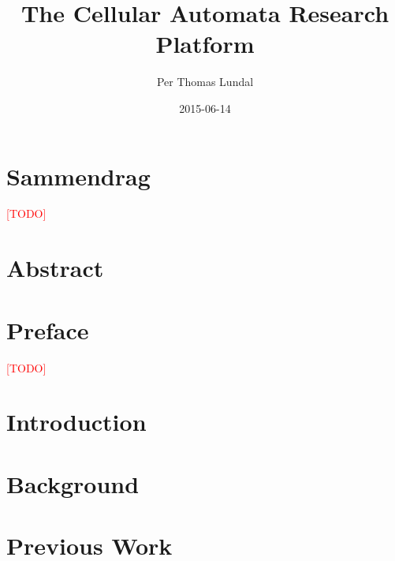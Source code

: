 \documentclass[a4paper,twoside,12pt]{book}
\title{
    {The Cellular Automata Research Platform}\\
    \TODO
}
\author{Per Thomas Lundal}
\date{2015-06-14}
\newcommand\TODO{\textcolor{red}{[TODO]}}
\begin{document}
\maketitle

\clearpage
\null
{}
\newpage


\cleardoublepage
{}
{}
\chapter*{Sammendrag}
    \TODO

\cleardoublepage
{}
{}
\chapter*{Abstract}
    

\cleardoublepage
{}
{}
\chapter*{Preface}
    \TODO

\setcounter{tocdepth}{2}

\cleardoublepage
{}
{}
\tableofcontents

\cleardoublepage
{}
{}
\listoffigures

\cleardoublepage
{}
{}
\listoftables

\cleardoublepage
{}

\chapter{Introduction}
    \label{ch:introduction}
    

\chapter{Background}
    \label{ch:background}
    

\chapter{Previous Work}
    \label{ch:previous-work}
    
\end{document}
